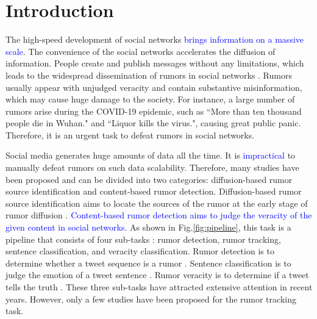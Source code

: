\documentclass[review]{elsarticle}
\begin{document}
\section{Introduction}
\label{sec:introduction}
The high-speed development of social networks \textcolor{blue}{brings information on a massive scale}. The convenience of the social networks accelerates the diffusion of information. People create and publish messages without any limitations, which leads to the widespread dissemination of rumors in social networks \cite{DBLP:journals/corr/KurkaGZ15, DBLP:journals/csur/ZubiagaABLP18, DBLP:conf/sirocco/KostkaOW08, vosoughi2018spread}. Rumors usually appear with unjudged veracity and contain substantive misinformation, which may cause huge damage to the society. For instance, a large number of rumors arise during the COVID-19 epidemic, such as ``More than ten thousand people die in Wuhan." and ``Liquor kills the virus.", causing great public panic. Therefore, it is an urgent task to defeat rumors in social networks.

Social media generates huge amounts of data all the time. It is \textcolor{blue}{impractical} to manually defeat rumors on such data scalability. Therefore, many studies have been proposed and can be divided into two categories: diffusion-based rumor source identification and content-based rumor detection. Diffusion-based rumor source identification aims to locate the sources of the rumor at the early stage of rumor diffusion \cite{DBLP:conf/sigmetrics/ShahZ10, DBLP:journals/tit/ShahZ11, DBLP:conf/kdd/LappasTGM10}. \textcolor{blue}{Content-based rumor detection aims to judge the veracity of the given content in social networks.} As shown in Fig.\ref{fig:pipeline}, this task is a pipeline that consists of four sub-tasks \cite{DBLP:journals/csur/ZubiagaABLP18, DBLP:conf/coling/KochkinaLZ18}: rumor detection, rumor tracking, sentence classification, and veracity classification. Rumor detection is to determine whether a tweet sequence is a rumor  \cite{DBLP:conf/socinfo/ZubiagaLP17, DBLP:conf/www/Ma0W19,DBLP:conf/naacl/NguyenDCD19, DBLP:journals/corr/abs-1906-05659}. Sentence classification is to judge the emotion of a tweet sentence \cite{DBLP:conf/semeval/EnayetE17, DBLP:conf/semeval/X17a, DBLP:conf/coling/ZubiagaKLPL16}. Rumor veracity is to determine if a tweet tells the truth \cite{DBLP:conf/coling/KochkinaLZ18, DBLP:conf/acl/LiZS19, DBLP:conf/acl/KumarC19}. These three sub-tasks have attracted extensive attention in recent years. However, only a few studies have been proposed for the rumor tracking task.
\end{document}
